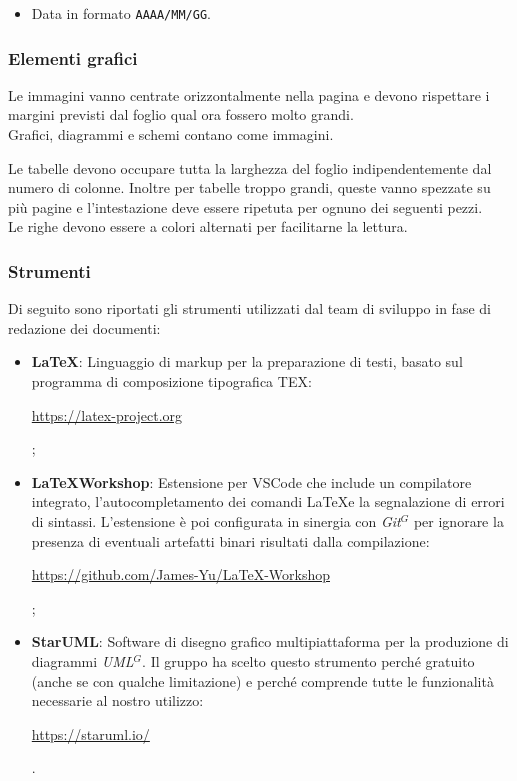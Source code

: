 
\begin{itemize}
\item Data in formato \texttt{AAAA/MM/GG}. %
\end{itemize}

\subsubsection{Elementi grafici}

    Le immagini vanno centrate orizzontalmente nella pagina e devono rispettare i margini previsti dal foglio qual ora
    fossero molto grandi.\\
    Grafici, diagrammi e schemi contano come immagini.

    Le tabelle devono occupare tutta la larghezza del foglio indipendentemente dal numero di colonne.
    Inoltre per tabelle troppo grandi, queste vanno spezzate su più pagine e l'intestazione deve essere ripetuta
    per ognuno dei seguenti pezzi.\\
    Le righe devono essere a colori alternati per facilitarne la lettura.
\pagebreak
\subsubsection{Strumenti}

Di seguito sono riportati gli strumenti utilizzati dal team di sviluppo in fase di redazione dei documenti:

\begin{itemize}
\item \textbf{\LaTeX}: Linguaggio di markup per la preparazione di testi, basato sul programma di composizione tipografica TEX: \begin{center} \url{https://latex-project.org} \end{center};
\item \textbf{\LaTeX Workshop}: Estensione per VSCode che include un compilatore integrato, l'autocompletamento dei comandi \LaTeX e la segnalazione di errori di sintassi. L'estensione è poi configurata in sinergia con \emph{Git}$^{G}$ per ignorare la presenza di eventuali artefatti binari risultati dalla compilazione: \begin{center} \url{https://github.com/James-Yu/LaTeX-Workshop} \end{center};
\item \textbf{StarUML}: Software di disegno grafico multipiattaforma per la produzione di diagrammi \emph{UML}$^{G}$. Il gruppo ha scelto questo strumento perché gratuito (anche se con qualche limitazione) e perché comprende tutte le funzionalità necessarie al nostro utilizzo: \begin{center} \url{https://staruml.io/} \end{center}.
\end{itemize}

